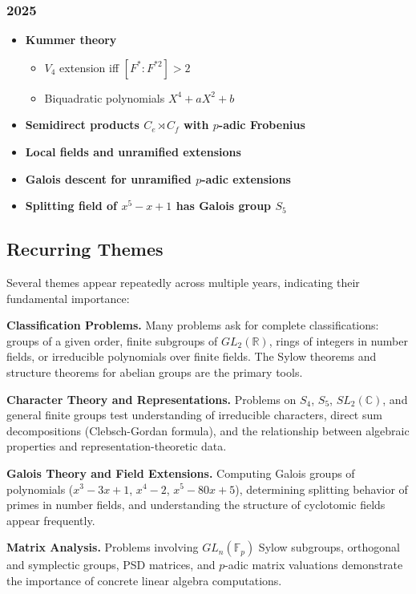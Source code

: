 \subsubsection*{2025}
\begin{itemize}
    \item \textbf{Kummer theory}
        \begin{itemize}
            \item $V_4$ extension iff $[F^*:F^{*2}] > 2$
            \item Biquadratic polynomials $X^4+aX^2+b$
        \end{itemize}
    \item \textbf{Semidirect products $C_e \rtimes C_f$ with $p$-adic Frobenius}
    \item \textbf{Local fields and unramified extensions}
    \item \textbf{Galois descent for unramified $p$-adic extensions}
    \item \textbf{Splitting field of $x^5-x+1$ has Galois group $S_5$}
\end{itemize}

\subsection{Recurring Themes}

Several themes appear repeatedly across multiple years, indicating their fundamental importance:

\medskip
\noindent\textbf{Classification Problems.} Many problems ask for complete classifications: groups of a given order, finite subgroups of $GL_2(\mathbb{R})$, rings of integers in number fields, or irreducible polynomials over finite fields. The Sylow theorems and structure theorems for abelian groups are the primary tools.

\medskip
\noindent\textbf{Character Theory and Representations.} Problems on $S_4$, $S_5$, $SL_2(\mathbb{C})$, and general finite groups test understanding of irreducible characters, direct sum decompositions (Clebsch-Gordan formula), and the relationship between algebraic properties and representation-theoretic data.

\medskip
\noindent\textbf{Galois Theory and Field Extensions.} Computing Galois groups of polynomials ($x^3-3x+1$, $x^4-2$, $x^5-80x+5$), determining splitting behavior of primes in number fields, and understanding the structure of cyclotomic fields appear frequently.

\medskip
\noindent\textbf{Matrix Analysis.} Problems involving $GL_n(\mathbb{F}_p)$ Sylow subgroups, orthogonal and symplectic groups, PSD matrices, and $p$-adic matrix valuations demonstrate the importance of concrete linear algebra computations.

